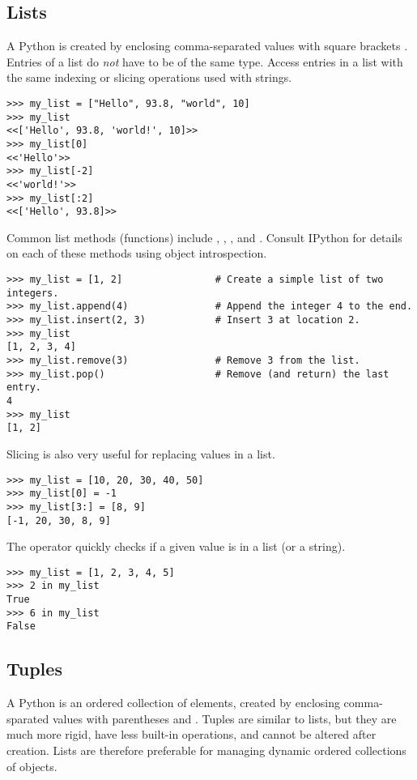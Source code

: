 \subsection*{Lists} %

A Python  is created by enclosing comma-separated values with square brackets \li{[ ]}.
Entries of a list do \emph{not} have to be of the same type.
Access entries in a list with the same indexing or slicing operations used with strings.

\begin{lstlisting}
>>> my_list = ["Hello", 93.8, "world", 10]
>>> my_list
<<['Hello', 93.8, 'world!', 10]>>
>>> my_list[0]
<<'Hello'>>
>>> my_list[-2]
<<'world!'>>
>>> my_list[:2]
<<['Hello', 93.8]>>
\end{lstlisting}

Common list methods (functions) include , , , and .
Consult IPython for details on each of these methods using object introspection.
\begin{lstlisting}
>>> my_list = [1, 2]                # Create a simple list of two integers.
>>> my_list.append(4)               # Append the integer 4 to the end.
>>> my_list.insert(2, 3)            # Insert 3 at location 2.
>>> my_list
[1, 2, 3, 4]
>>> my_list.remove(3)               # Remove 3 from the list.
>>> my_list.pop()                   # Remove (and return) the last entry.
4
>>> my_list
[1, 2]
\end{lstlisting}

Slicing is also very useful for replacing values in a list.
\begin{lstlisting}
>>> my_list = [10, 20, 30, 40, 50]
>>> my_list[0] = -1
>>> my_list[3:] = [8, 9]
[-1, 20, 30, 8, 9]
\end{lstlisting}

The  operator quickly checks if a given value is in a list (or a string).
\begin{lstlisting}
>>> my_list = [1, 2, 3, 4, 5]
>>> 2 in my_list
True
>>> 6 in my_list
False
\end{lstlisting}

\subsection*{Tuples} %

A Python  is an ordered collection of elements, created by enclosing comma-sparated values with parentheses \li{(} and \li{)}.
Tuples are similar to lists, but they are much more rigid, have less built-in operations, and cannot be altered after creation.
Lists are therefore preferable for managing dynamic ordered collections of objects.

